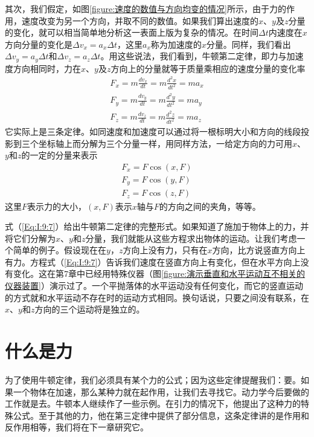其次，我们假定，如图\ref{figure:速度的数值与方向均变的情况}所示，由于力的作用，速度改变为另一个方向，并取不同的数值。如果我们算出速度的$x$、$y$及$z$分量的变化，就可以相当简单地分析这一表面上版为复杂的情况。在时间$\Delta t$内速度在$x$方向分量的变化是$\Delta v_x=a_x \Delta t$，这里$a_x$称为加速度的$x$分量。同样，我们看出$\Delta v_y=a_y \Delta t$和$\Delta v_z=a_z \Delta t$。用这些说法，我们看到，牛顿第二定律，即力与加速度方向相同时，力在$x$、$y$及$z$方向上的分量就等于质量乘相应的速度分量的变化率
\begin{equation}
    \label{Eq:I:9:7}
    \begin{split}
        F_x=m\frac{dv_x}{dt}=m\frac{d^2x}{dt^2}=ma_x \\
        F_y=m\frac{dv_y}{dt}=m\frac{d^2y}{dt^2}=ma_y \\
        F_z=m\frac{dv_z}{dt}=m\frac{d^2z}{dt^2}=ma_z
    \end{split}
\end{equation}
它实际上是三条定律。如同速度和加速度可以通过将一根标明大小和方向的线段投影到三个坐标轴上而分解为三个分量一样，用同样方法，一给定方向的力可用$x$、$y$和$z$的一定的分量来表示
\begin{equation}
    \label{Eq:I:9:8}
    \begin{split}
        F_x=F\cos(x,F) \\
        F_y=F\cos(y,F) \\
        F_z=F\cos(z,F)
    \end{split}
\end{equation}
这里$F$表示力的大小，$(x,F)$表示$x$轴与$F$的方向之间的夹角，等等。

式（\ref{Eq:I:9:7}）给出牛顿第二定律的完整形式。如果知道了施加于物体上的力，并将它们分解为$x$、$y$和$z$分量，我们就能从这些方程求出物体的运动。让我们考虑一个简单的例子。假设现在在$y$，$z$方向上没有力，只有在$x$方向，比方说竖直方向上有力。方程式（\ref{Eq:I:9:7}）告诉我们速度在竖直方向上有变化，但在水平方向上没有变化。这在第7章中已经用特殊仪器（图\ref{figure:演示垂直和水平运动互不相关的仪器装置}）演示过了。一个平抛落体的水平运动没有任何变化，而它的竖直运动的方式就和水平运动不存在时的运动方式相同。换句话说，只要之间没有联系，在$x$、$y$和$z$方向的三个运动将是独立的。

\section{什么是力}

为了使用牛顿定律，我们必须具有某个力的公式；因为这些定律提醒我们：要。如果一个物体在加速，那么某种力就在起作用，让我们去寻找它。动力学今后要做的工作就是去。牛顿本人继续作了一些示例。在引力的情况下，他提出了这种力的特殊公式。至于其他的力，他在第三定律中提供了部分信息，这条定律讲的是作用和反作用相等，我们将在下一章研究它。

